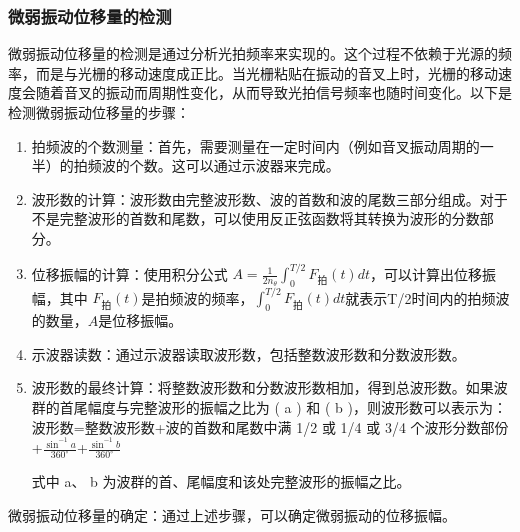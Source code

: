 \documentclass[dvipsnames, svgnames,a4paper,11pt]{article}
\begin{document}
		\begin{figure}[htbp]
			\centering
			\quad
			\quad
			
		\end{figure}

	\subsubsection{微弱振动位移量的检测}

		微弱振动位移量的检测是通过分析光拍频率来实现的。这个过程不依赖于光源的频率，而是与光栅的移动速度成正比。当光栅粘贴在振动的音叉上时，光栅的移动速度会随着音叉的振动而周期性变化，从而导致光拍信号频率也随时间变化。以下是检测微弱振动位移量的步骤：
			\begin{enumerate}
				\item 拍频波的个数测量：首先，需要测量在一定时间内（例如音叉振动周期的一半）的拍频波的个数。这可以通过示波器来完成。
				\item 波形数的计算：波形数由完整波形数、波的首数和波的尾数三部分组成。对于不是完整波形的首数和尾数，可以使用反正弦函数将其转换为波形的分数部分。
				\item 位移振幅的计算：使用积分公式 $ A =\frac{1}{2n_\theta} \int_0^{T/2} F_{拍}(t)  dt $，可以计算出位移振幅，其中 $ F_{拍}(t)  $是拍频波的频率，$\int_0^{T/2} F_{拍}(t)  dt$就表示T/2时间内的拍频波的数量，$ A  $是位移振幅。
				\item 示波器读数：通过示波器读取波形数，包括整数波形数和分数波形数。
				\item 波形数的最终计算：将整数波形数和分数波形数相加，得到总波形数。如果波群的首尾幅度与完整波形的振幅之比为 ( a ) 和 ( b )，则波形数可以表示为：
				波形数=整数波形数+波的首数和尾数中满 1/2 或 1/4 或 3/4 个波形分数部份+$\frac{\sin^{-1}a}{360^\circ}$+$\frac{\sin^{-1}b}{360^\circ}$

				式中 a、 b 为波群的首、尾幅度和该处完整波形的振幅之比。
			\end{enumerate}

		微弱振动位移量的确定：通过上述步骤，可以确定微弱振动的位移振幅。


		\begin{figure}[htbp]
			\centering
			\quad
			\quad
			
		\end{figure}
\end{document}
